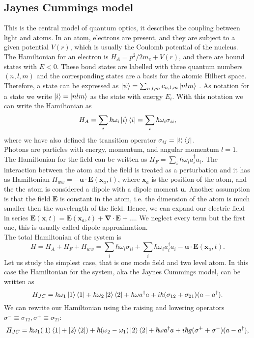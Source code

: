 \documentclass[12pt]{article}
\theoremstyle{plain}
\newcommand{\x}{\mathbf{x}}
\theoremstyle{definition}
\theoremstyle{remark}
\begin{document}
\subsection{Jaynes Cummings model}
This is the central model of quantum optics, it describes the coupling between light and atoms. In an atom, electrons are present, and they are subject to a given potential $V(r)$, which is usually the Coulomb potential of the nucleus. The Hamiltonian for an electron is $H_A = p^2/2m_e + V(r)$, and there are bound states with $E<0$. These bond states are labelled with three quantum numbers $(n,l,m)$ and the corresponding states are a basis for the atomic Hilbert space. Therefore, a state can be expressed as $\ket{\psi} = \sum_{n,l,m}c_{n,l,m}\ket{nlm}$ . 
As notation for a state we write $\ket{i} = \ket{nlm}$ as the state with energy $E_i$. With this notation we can write the Hamiltonian as
\[H_A = \sum_i \hbar \omega_i \ket{i}\bra{i} = \sum_i \hbar \omega_i \sigma_{ii}, \]
where we have also defined the transition operator $\sigma_{ij} = \ket{i}\bra{j}$.\\
Photons are particles with energy, momentum, and angular momentum $l=1$. The Hamiltonian for the field can be written as $H_F = \sum_i \hbar \omega_i a^\dagger_ia_i$. The interaction between the atom and the field is treated as a perturbation and it has as Hamiltonian $H_{ww} = -\mathbf{u}\cdot \mathbf{E}(\x_a,t)$, where $\x_a$ is the position of the atom, and the the atom is considered a dipole with a dipole moment $\mathbf{u}$. Another assumption is that the field $\mathbf{E}$ is constant in the atom, i.e. the dimension of the atom is much smaller then the wavelength of the field. Hence, we can expand our electric field in series $\mathbf{E}(\x,t) = \mathbf{E}(\x_a,t) + \mathbf{\nabla}\cdot \mathbf{E} + \dots$. We neglect every term but the first one, this is usually called dipole approximation.\\
The total Hamiltonian of the system is 
\[H = H_A + H_F +H_{ww} = \sum_i \hbar \omega_i \sigma_{ii} + \sum_i \hbar \omega_i a^\dagger_ia_i -\mathbf{u}\cdot \mathbf{E}(\x_a,t). \]
Let us study the simplest case, that is one mode field and two level atom. In this case the Hamiltonian for the system, aka the Jaynes Cummings model, can be written as
\[H_{JC} = \hbar \omega_1 \ket{1}\bra{1} + \hbar \omega_2 \ket{2}\bra{2} + \hbar \omega a^\dagger a + i\hbar(\sigma_{12}+\sigma_{21})(a-a^\dagger).\]
We can rewrite our Hamiltonian using the raising and  lowering operators $\sigma^-\equiv \sigma_{12},\sigma^+\equiv \sigma_{21}$:
\[H_{JC} = \hbar \omega_1(\ket{1}\bra{1} +  \ket{2}\bra{2}) + \hbar(\omega_2-\omega_1)\ket{2}\bra{2} + \hbar\omega a^\dagger a + i\hbar g(\sigma^+ + \sigma^-)(a-a^\dagger), \]
\end{document}
